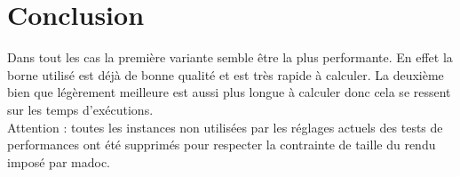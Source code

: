 \documentclass[12pt,a4paper]{article}
\begin{document}
\section{Conclusion}

Dans tout les cas la première variante semble être la plus performante. En effet la borne utilisé est déjà de bonne qualité et est très rapide à calculer. La deuxième bien que légèrement meilleure est aussi plus longue à calculer donc cela se ressent sur les temps d’exécutions.\\

Attention : toutes les instances non utilisées par les réglages actuels des tests de performances ont été supprimés pour respecter la contrainte de taille du rendu imposé par madoc.
\end{document}
